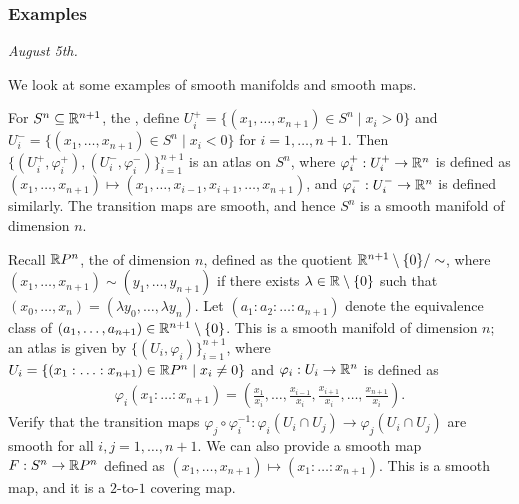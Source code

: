 \subsubsection{Examples}

\textit{August 5th.}

We look at some examples of smooth manifolds and smooth maps.

\begin{example}
    For $S^{n} \subseteq \mathbb{R}^{n+1}$, the , define $U_{i}^{+} = \{(x_{1},\ldots,x_{n+1}) \in S^{n} \mid x_{i} > 0\}$ and $U_{i}^{-} = \{(x_{1},\ldots,x_{n+1}) \in S^{n} \mid x_{i} < 0\}$ for $i = 1,\ldots,n+1$. Then $\{(U_{i}^{+},\varphi_{i}^{+}), (U_{i}^{-},\varphi_{i}^{-})\}_{i=1}^{n+1}$ is an atlas on $S^{n}$, where $\varphi_{i}^{+}:U_{i}^{+} \to \mathbb{R}^{n}$ is defined as $(x_{1},\ldots,x_{n+1}) \mapsto (x_{1},\ldots,x_{i-1},x_{i+1},\ldots,x_{n+1})$, and $\varphi_{i}^{-}:U_{i}^{-} \to \mathbb{R}^{n}$ is defined similarly. The transition maps are smooth, and hence $S^{n}$ is a smooth manifold of dimension $n$.
\end{example}

\begin{example}
    Recall $\mathbb{R} P^{n}$, the  of dimension $n$, defined as the quotient $\mathbb{R}^{n+1}\setminus\{0\}/\sim$, where $(x_{1},\ldots,x_{n+1}) \sim (y_{1},\ldots,y_{n+1})$ if there exists $\lambda \in \mathbb{R}\setminus\{0\}$ such that $(x_{0},\ldots,x_{n}) = (\lambda y_{0},\ldots,\lambda y_{n})$. Let $(a_{1}:a_{2}:\ldots:a_{n+1})$ denote the equivalence class of $(a_{1},\ldots,a_{n+1}) \in \mathbb{R}^{n+1}\setminus\{0\}$. This is a smooth manifold of dimension $n$; an atlas is given by $\{(U_{i},\varphi_{i})\}_{i=1}^{n+1}$, where $U_{i} = \{(x_{1}:\ldots:x_{n+1}) \in \mathbb{R} P^{n} \mid x_{i} \neq 0\}$ and $\varphi_{i}:U_{i} \to \mathbb{R}^{n}$ is defined as
    \begin{align}
        \varphi_{i}(x_{1}:\ldots:x_{n+1}) = \left( \frac{x_{1}}{x_{i}},\ldots,\frac{x_{i-1}}{x_{i}},\frac{x_{i+1}}{x_{i}},\ldots,\frac{x_{n+1}}{x_{i}} \right).
    \end{align}
    Verify that the transition maps $\varphi_{j} \circ \varphi_{i}^{-1}:\varphi_{i}(U_{i} \cap U_{j}) \to \varphi_{j}(U_{i} \cap U_{j})$ are smooth for all $i,j = 1,\ldots,n+1$. We can also provide a smooth map $F:S^{n} \to \mathbb{R} P^{n}$ defined as $(x_{1},\ldots,x_{n+1}) \mapsto (x_{1}:\ldots:x_{n+1})$. This is a smooth map, and it is a $2$-to-$1$ covering map.
\end{example}

